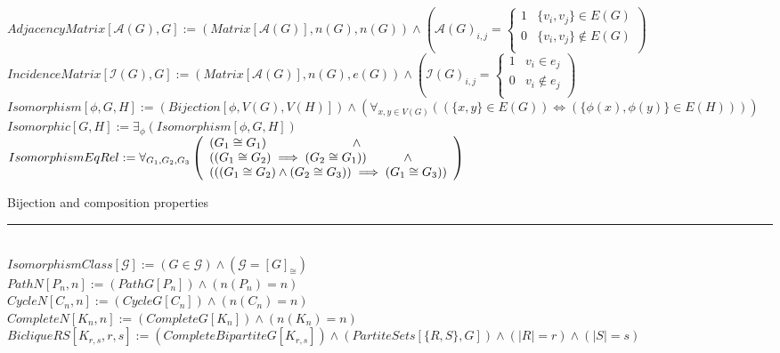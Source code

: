 \documentclass{book}
\newcommand{\abr}{:=}
\newcommand{\pr}[1]{\left(#1\right)}
\newcommand{\utup}[1]{\{#1\}}
\begin{document}
$AdjacencyMatrix[\mathcal{A}(G), G] \abr \pr{Matrix[\mathcal{A}(G)], n(G), n(G)} \land \pr{\mathcal{A}(G)_{i, j} =
\begin{cases}
  1 & \utup{v_i, v_j} \in E(G) \\
  0 & \utup{v_i, v_j} \notin E(G) \\
\end{cases}}$ \\

$IncidenceMatrix[\mathcal{I}(G), G] \abr \pr{Matrix[\mathcal{A}(G)], n(G), e(G)} \land \pr{\mathcal{I}(G)_{i, j} =
\begin{cases}
  1 & v_i \in e_j \\
  0 & v_i \notin e_j \\
\end{cases}}$ \\

$Isomorphism[\phi, G, H] \abr \pr{Bijection[\phi, V(G), V(H)]} \land \pr{\forall_{x, y \in V(G)}\pr{\pr{\utup{x, y} \in E(G)} \iff \pr{\utup{\phi(x), \phi(y)} \in E(H)}}}$ \\
$Isomorphic[G, H] \abr \exists_{\phi}(Isomorphism[\phi, G, H])$ \\

$IsomorphismEqRel \abr \forall_{G_1, G_2, G_3}
\left(\begin{array}{ll}
  (G_1 \cong G_1) \hfill \land \hfill \\
  \pr{(G_1 \cong G_2) \implies (G_2 \cong G_1)} \hfill \land \hfill \\
  \pr{\pr{(G_1 \cong G_2) \land (G_2 \cong G_3)} \implies (G_1 \cong G_3)} \\
\end{array}\right)$
\begin{enumerate}
  \lit Bijection and composition properties
\end{enumerate} \vspace{.75mm} \hrule \vspace{.75mm} \ \\
$IsomorphismClass[\mathcal{G}] \abr (G \in \mathcal{G}) \land (\mathcal{G} = [G]_{\cong})$ \\

$PathN[P_n, n] \abr (PathG[P_n]) \land \pr{n(P_n) = n}$ \\
$CycleN[C_n, n] \abr (CycleG[C_n]) \land \pr{n(C_n) = n}$ \\
$CompleteN[K_n, n] \abr (CompleteG[K_n]) \land \pr{n(K_n) = n}$ \\
$BicliqueRS[K_{r, s}, r, s] \abr (CompleteBipartiteG[K_{r, s}]) \land (PartiteSets[\{R, S\}, G]) \land (|R| = r) \land (|S| = s)$ \\
\end{document}
